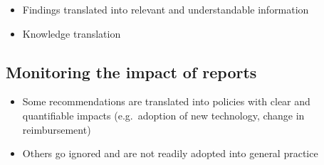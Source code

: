 \documentclass[
]{book}
\providecommand{\tightlist}{%
  \setlength{\itemsep}{0pt}\setlength{\parskip}{0pt}}
\begin{document}
\begin{itemize}
\tightlist
\item
  Findings translated into relevant and understandable information
\item
  Knowledge translation
\end{itemize}

\hypertarget{monitoring-the-impact-of-reports}{%
\subsection{Monitoring the impact of reports}\label{monitoring-the-impact-of-reports}}

\begin{itemize}
\tightlist
\item
  Some recommendations are translated into policies with clear and quantifiable impacts (e.g.~adoption of new technology, change in reimbursement)
\item
  Others go ignored and are not readily adopted into general practice
\end{itemize}

  
\end{document}
